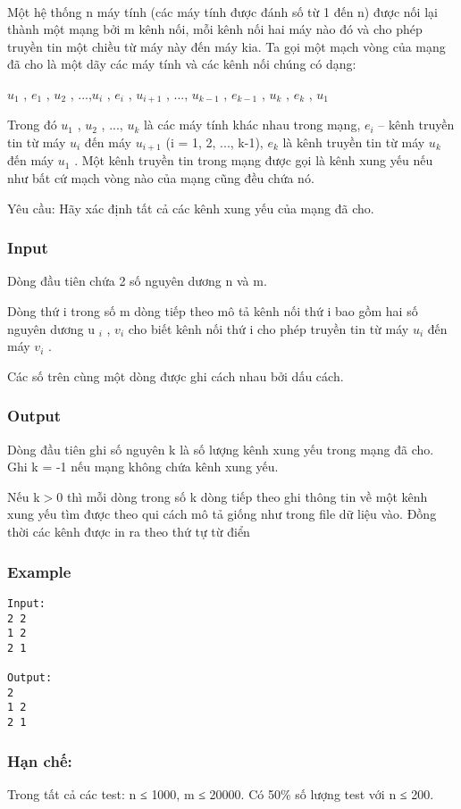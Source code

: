

 

Một hệ thống n máy tính (các máy tính được đánh số từ 1 đến n) được nối lại thành một mạng bởi m kênh nối, mỗi kênh nối hai máy nào đó và cho phép truyền tin một chiều từ máy này đến máy kia. Ta gọi một mạch vòng của mạng đã cho là một dãy các máy tính và các kênh nối chúng có dạng:

$u_{1}$ , $e_{1}$ , $u_{2}$ , ...,$u_{i}$ , $e_{i}$ , $u_{i+1}$ , ..., $u_{k-1}$ , $e_{k-1}$ , $u_{k}$ , $e_{k}$ , $u_{1}$

Trong đó $u_{1}$ , $u_{2}$ , ..., $u_{k}$ là các máy tính khác nhau trong mạng, $e_{i}$ – kênh truyền tin từ máy $u_{i}$ đến máy $u_{i+1}$ (i = 1, 2, ..., k-1), $e_{k}$ là kênh truyền tin từ máy $u_{k}$ đến máy $u_{1}$ . Một kênh truyền tin trong mạng được gọi là kênh xung yếu nếu như bất cứ mạch vòng nào của mạng cũng đều chứa nó.

Yêu cầu: Hãy xác định tất cả các kênh xung yếu của mạng đã cho.

\subsubsection{Input}

Dòng đầu tiên chứa 2 số nguyên dương n và m.

Dòng thứ i trong số m dòng tiếp theo mô tả kênh nối thứ i bao gồm hai số nguyên dương u­ $_ i $ , $v_{i}$ cho biết kênh nối thứ i cho phép truyền tin từ máy $u_{i}$ đến máy $v_{i}$ .

Các số trên cùng một dòng được ghi cách nhau bởi dấu cách.

\subsubsection{Output}

Dòng đầu tiên ghi số nguyên k là số lượng kênh xung yếu trong mạng đã cho. Ghi k = -1 nếu mạng không chứa kênh xung yếu.

Nếu k$>$0 thì mỗi dòng trong số k dòng tiếp theo ghi thông tin về một kênh xung yếu tìm được theo qui cách mô tả giống như trong file dữ liệu vào. Đồng thời các kênh được in ra theo thứ tự từ điển

\subsubsection{Example}
\begin{verbatim}
Input:
2 2
1 2
2 1

Output:
2
1 2
2 1

\end{verbatim}

\subsubsection{Hạn chế:}

Trong tất cả các test: n ≤ 1000, m ≤ 20000. Có 50\% số lượng test với n ≤ 200.
